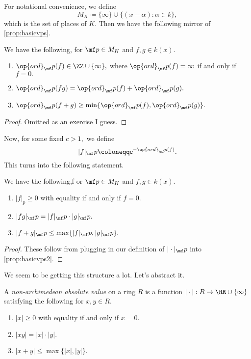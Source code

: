 \documentclass[../notes.tex]{subfiles}
\begin{document}
For notational convenience, we define
\[M_K\coloneqq \{\infty\}\cup\{(x-\alpha):\alpha\in k\},\]
which is the set of places of $K.$ Then we have the following mirror of \autoref{prop:basicvps}.
\begin{proposition} \label{prop:basicvps2}
	We have the following, for $\mf p\in M_K$ and $f,g\in k(x).$
	\begin{enumerate}[label=(\alph*)]
		\item $\op{ord}_\mf p(f)\in\ZZ\cup\{\infty\},$ where $\op{ord}_\mf p(f)=\infty$ if and only if $f=0.$
		\item $\op{ord}_\mf p(fg)=\op{ord}_\mf p(f)+\op{ord}_\mf p(g).$
		\item $\op{ord}_\mf p(f+g)\ge\min\{\op{ord}_\mf p(f),\op{ord}_\mf p(g)\}.$
	\end{enumerate}
\end{proposition}
\begin{proof}
	Omitted as an exercise I guess.\todo{}
\end{proof}
Now, for some fixed $c>1,$ we define
\[|f|_\mf p\coloneqq c^{-\op{ord}_\mf p(f)}.\]
This turns into the following statement.
\begin{corollary}
	We have the following,f or $\mf p\in M_K$ and $f,g\in k(x).$
	\begin{enumerate}[label=(\alph*)]
		\item $|f|_p\ge0$ with equality if and only if $f=0.$
		\item $|fg|_\mf p=|f|_\mf p\cdot|g|_\mf p.$
		\item $|f+g|_\mf p\le\max\{|f|_\mf p,|g|_\mf p\}.$
	\end{enumerate}
\end{corollary}
\begin{proof}
	These follow from plugging in our definition of $|\cdot|_\mf p$ into \autoref{prop:basicvps2}.
\end{proof}
We seem to be getting this structure a lot. Let's abstract it.
\begin{definition}
	A \textit{non-archimedean absolute value} on a ring $R$ is a function $|\cdot|:R\to\RR\cup\{\infty\}$ satisfying the following for $x,y\in R.$
	\begin{enumerate}
		\item $|x|\ge0$ with equality if and only if $x=0.$
		\item $|xy|=|x|\cdot|y|.$
		\item $|x+y|\le\max\{|x|,|y|\}.$
	\end{enumerate}
\end{definition}
\end{document}
